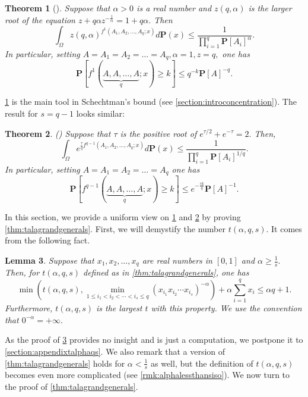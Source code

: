 \documentclass[11pt]{article}%
\newtheorem{theorem}{Theorem}
\newtheorem{lemma}[theorem]{Lemma}
\numberwithin{theorem}{subsection}
\newcommand{\prob}{\mathbf{P}}
\begin{document}
\begin{theorem}[{\cite[Section 3.2]{Talagrand01}}]
\label{thm:talagrands1} Suppose that $\alpha>0$ is a real number and $z(q,\alpha)$ is the larger root of the equation $z+q\alpha z^{-\frac{1}{\alpha}} = 1+q\alpha.$
Then
$$
\int_{\Omega}
z(q,\alpha)^{f^1(A_1, A_2, \ldots, A_q; x)}d\prob(x)\le 
\frac{1}{\prod_{i=1}^q \prob[A_i]^\alpha}.
$$
In particular, setting $A= A_1 = A_2= \ldots = A_q, \alpha = 1, z= q,$ one has
$$\prob[f^1(\underbrace{A, A, \ldots, A}_{q}; x)\ge k]\le 
q^{-k}\prob[A]^{-q}.$$
\end{theorem}

\noindent
\cref{thm:talagrands1} is the main tool in Schechtman's bound (see \cref{section:introconcentration}).
The result for $s = q-1$ looks similar:

\begin{theorem}
\label{thm:talagrandsq1}
(\cite[Theorem 5.4]{Talagrand96}) Suppose that $\tau$ is the positive root of $e^{\tau/2} +e^{-\tau} = 2.$ Then,
$$
\int_{\Omega}
e^{\frac{\tau}{q}f^{q-1}(A_1, A_2, \ldots, A_q; x)}d\prob(x)\le 
\frac{1}{\prod_{i=1}^q \prob[A_i]^{1/q}}.
$$
In particular, setting $A= A_1 = A_2= \ldots = A_q$ one has
$$\prob[f^{q-1}(\underbrace{A, A, \ldots, A}_{q}; x)\ge k]\le 
e^{-\frac{\tau k}{q}}\prob[A]^{-1}.$$
\end{theorem}

\noindent
In this section, we provide a uniform view on 
\cref{thm:talagrands1} and \cref{thm:talagrandsq1} by proving \cref{thm:talagrandgenerals}.
First, we will demystify the number $t(\alpha, q, s).$ It comes from the following fact.

\begin{lemma}
\label{lemma:talphaqs}
Suppose that $x_1, x_2, \ldots, x_q$ are real numbers in $[0,1]$ and $\alpha \ge \frac{1}{s}.$ Then, for $t(\alpha,q,s)$ defined as in \cref{thm:talagrandgenerals}, one has
$$
\min \left(
t(\alpha, q, s),
\min_{1\le i_1<i_2<\cdots <i_s\le q}
(x_{i_1}x_{i_2}\cdots x_{i_s})^{-\alpha}
\right)
+ \alpha \sum_{i = 1}^q x_i \le 
\alpha q + 1.
$$
Furthermore, $t(\alpha,q,s)$ is the largest $t$ with this property. We use the convention that $0^{-\alpha}  = +\infty.$
\end{lemma}

\noindent
As the proof of \cref{lemma:talphaqs} provides no insight and is just a computation, we postpone it to \cref{section:appendixtalphaqs}.
We also remark that a version of \cref{thm:talagrandgenerals} holds for $\alpha <\frac{1}{s}$ as well, but the definition of $t(\alpha,q,s)$ becomes even more complicated (see \cref{rmk:alphalessthansiso}).
We now turn to the proof of \cref{thm:talagrandgenerals}.
\end{document}
